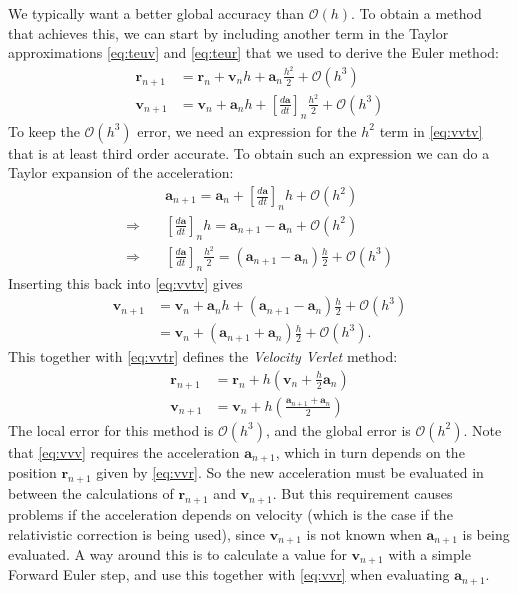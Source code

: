 \documentclass{article}
\newcommand{\lrp}[1]{\left(#1\right)}
\newcommand{\lrb}[1]{\left[#1\right]}
\newcommand{\mb}[1]{\mathbf{#1}}
\begin{document}
We typically want a better global accuracy than $\mathcal{O}(h)$. To obtain a method that achieves this, we can start by including another term in the Taylor approximations \eqref{eq:teuv} and \eqref{eq:teur} that we used to derive the Euler method:
\begin{align}
    \mb{r}_{n+1} &= \mb{r}_n + \mb{v}_n h + \mb{a}_n\frac{h^2}{2} + \mathcal{O}(h^3) \label{eq:vvtr} \\
    \mb{v}_{n+1} &= \mb{v}_n + \mb{a}_n h + \lrb{\frac{d\mb{a}}{dt}}_n\frac{h^2}{2} + \mathcal{O}(h^3) \label{eq:vvtv}
\end{align}
To keep the $\mathcal{O}(h^3)$ error, we need an expression for the $h^2$ term in \eqref{eq:vvtv} that is at least third order accurate. To obtain such an expression we can do a Taylor expansion of the acceleration:
\begin{align*}
    &\mb{a}_{n+1} = \mb{a}_n + \lrb{\frac{d\mb{a}}{dt}}_n h + \mathcal{O}(h^2) \\
    \Rightarrow\quad &\lrb{\frac{d\mb{a}}{dt}}_n h = \mb{a}_{n+1} - \mb{a}_n + \mathcal{O}(h^2) \\
    \Rightarrow\quad &\lrb{\frac{d\mb{a}}{dt}}_n \frac{h^2}{2} = \lrp{\mb{a}_{n+1} - \mb{a}_n}\frac{h}{2} + \mathcal{O}(h^3)
\end{align*}
Inserting this back into \eqref{eq:vvtv} gives
\begin{align*}
    \mb{v}_{n+1} &= \mb{v}_n + \mb{a}_n h + \lrp{\mb{a}_{n+1} - \mb{a}_n}\frac{h}{2} + \mathcal{O}(h^3) \\
    &= \mb{v}_n + \lrp{\mb{a}_{n+1} + \mb{a}_n}\frac{h}{2} + \mathcal{O}(h^3).
\end{align*}
This together with \eqref{eq:vvtr} defines the \textit{Velocity Verlet} method:
\begin{align}
    \mb{r}_{n+1} &= \mb{r}_n + h\lrp{\mb{v}_n + \frac{h}{2}\mb{a}_n} \label{eq:vvr} \\
    \mb{v}_{n+1} &= \mb{v}_n + h\lrp{\frac{\mb{a}_{n+1} + \mb{a}_n}{2}} \label{eq:vvv}
\end{align}
The local error for this method is $\mathcal{O}(h^3)$, and the global error is $\mathcal{O}(h^2)$. Note that \eqref{eq:vvv} requires the acceleration $\mb{a}_{n+1}$, which in turn depends on the position $\mb{r}_{n+1}$ given by \eqref{eq:vvr}. So the new acceleration must be evaluated in between the calculations of $\mb{r}_{n+1}$ and $\mb{v}_{n+1}$. But this requirement causes problems if the acceleration depends on velocity (which is the case if the relativistic correction is being used), since $\mb{v}_{n+1}$ is not known when $\mb{a}_{n+1}$ is being evaluated. A way around this is to calculate a value for $\mb{v}_{n+1}$ with a simple Forward Euler step, and use this together with \eqref{eq:vvr} when evaluating $\mb{a}_{n+1}$. \\\\
\end{document}
